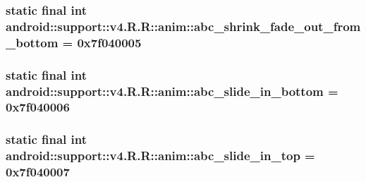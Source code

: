 \hypertarget{classandroid_1_1support_1_1v4_1_1_r_1_1anim_8180eff7120a2d0be9208b4a3502f9fb}{
\subsubsection[{abc\_\-shrink\_\-fade\_\-out\_\-from\_\-bottom}]{\setlength{\rightskip}{0pt plus 5cm}static final int android::support::v4.R.R::anim::abc\_\-shrink\_\-fade\_\-out\_\-from\_\-bottom = 0x7f040005}}
\label{classandroid_1_1support_1_1v4_1_1_r_1_1anim_8180eff7120a2d0be9208b4a3502f9fb}


\hypertarget{classandroid_1_1support_1_1v4_1_1_r_1_1anim_723621ace64cd8b63b1810115f911f36}{
\subsubsection[{abc\_\-slide\_\-in\_\-bottom}]{\setlength{\rightskip}{0pt plus 5cm}static final int android::support::v4.R.R::anim::abc\_\-slide\_\-in\_\-bottom = 0x7f040006}}
\label{classandroid_1_1support_1_1v4_1_1_r_1_1anim_723621ace64cd8b63b1810115f911f36}


\hypertarget{classandroid_1_1support_1_1v4_1_1_r_1_1anim_c618fbbaa255a72fa712ff0af0053082}{
\subsubsection[{abc\_\-slide\_\-in\_\-top}]{\setlength{\rightskip}{0pt plus 5cm}static final int android::support::v4.R.R::anim::abc\_\-slide\_\-in\_\-top = 0x7f040007}}
\label{classandroid_1_1support_1_1v4_1_1_r_1_1anim_c618fbbaa255a72fa712ff0af0053082}



